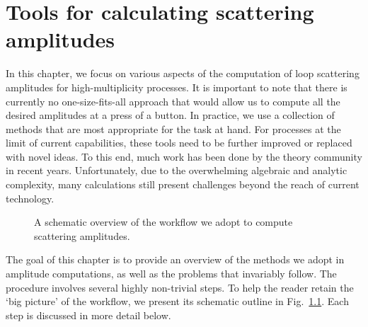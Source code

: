 \documentclass[main.tex]{subfiles}
\begin{document}
\chapter{Tools for calculating scattering amplitudes} \label{sec:tools}
In this chapter, we focus on various aspects of the computation of loop scattering amplitudes for high-multiplicity processes. It is important to note that there is currently no one-size-fits-all approach that would allow us to compute all the desired amplitudes at a press of a button. In practice, we use a collection of methods that are most appropriate for the task at hand. For processes at the limit of current capabilities, these tools need to be further improved or replaced with novel ideas. To this end, much work has been done by the theory community in recent years. Unfortunately, due to the overwhelming algebraic and analytic complexity, many calculations still present challenges beyond the reach of current technology. 
\begin{figure}[t]
\caption{A schematic overview of the workflow we adopt to compute scattering amplitudes.}
\label{fig:outline}
\end{figure}
The goal of this chapter is to provide an overview of the methods we adopt in amplitude computations, as well as the problems that invariably follow. The procedure involves several highly non-trivial steps. To help the reader retain the `big picture' of the workflow, we present its schematic outline in Fig.~\ref{fig:outline}. Each step is discussed in more detail below. 
\end{document}

